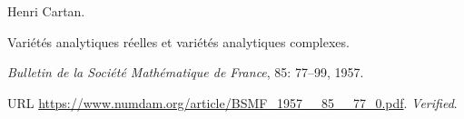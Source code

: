 Henri Cartan.

\newblock Vari\'et\'es analytiques r\'eelles et vari\'et\'es analytiques
  complexes.

\newblock \emph{Bulletin de la Soci\'et\'e Math\'ematique de France},
  85: 77--99, 1957.

\newblock URL \url{https://www.numdam.org/article/BSMF_1957__85__77_0.pdf}.
\newblock \emph{Verified}.

